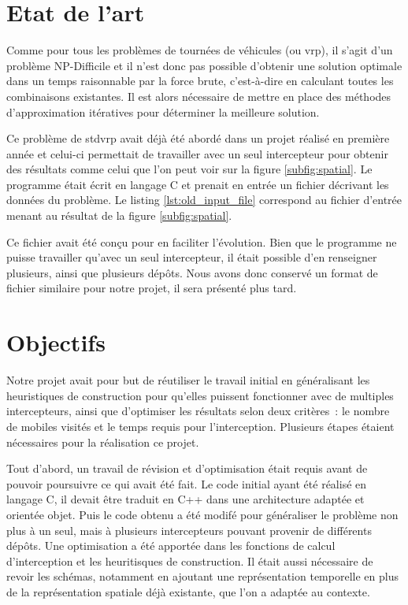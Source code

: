 	\section{Etat de l'art}
		Comme pour tous les problèmes de tournées de véhicules (ou \acrlong{vrp}), il s'agit d'un problème NP-Difficile et il n'est donc pas possible d'obtenir une solution optimale dans un temps raisonnable par la force brute, c'est-à-dire en calculant toutes les combinaisons existantes. Il est alors nécessaire de mettre en place des méthodes d'approximation itératives pour déterminer la meilleure solution.

		Ce problème de \acrlong{stdvrp} avait déjà été abordé dans un projet réalisé en première année et celui-ci permettait de travailler avec un seul intercepteur pour obtenir des résultats comme celui que l'on peut voir sur la figure \ref{subfig:spatial}. Le programme était écrit en langage C et prenait en entrée un fichier décrivant les données du problème. Le listing \ref{lst:old_input_file} correspond au fichier d'entrée menant au résultat de la figure \ref{subfig:spatial}.

		Ce fichier avait été conçu pour en faciliter l'évolution. Bien que le programme ne puisse travailler qu'avec un seul intercepteur, il était possible d'en renseigner plusieurs, ainsi que plusieurs dépôts. Nous avons donc conservé un format de fichier similaire pour notre projet, il sera présenté plus tard.

		\begin{code}
			\label{lst:old_input_file}
		\end{code}

	\section{Objectifs}
		Notre projet avait pour but de réutiliser le travail initial en généralisant les heuristiques de construction pour qu'elles puissent fonctionner avec de multiples intercepteurs, ainsi que d'optimiser les résultats selon deux critères : le nombre de mobiles visités et le temps requis pour l'interception.
		Plusieurs étapes étaient nécessaires pour la réalisation ce projet.

		Tout d'abord, un travail de révision et d'optimisation était requis avant de pouvoir poursuivre ce qui avait été fait. Le code initial ayant été réalisé en langage C, il devait être traduit en C++ dans une architecture adaptée et orientée objet. Puis le code obtenu a été modifé pour généraliser le problème non plus à un seul, mais à plusieurs intercepteurs pouvant provenir de différents dépôts. Une optimisation a été apportée dans les fonctions de calcul d'interception et les heuritisques de construction. Il était aussi nécessaire de revoir les schémas, notamment en ajoutant une représentation temporelle en plus de la représentation spatiale déjà existante, que l'on a adaptée au contexte.

